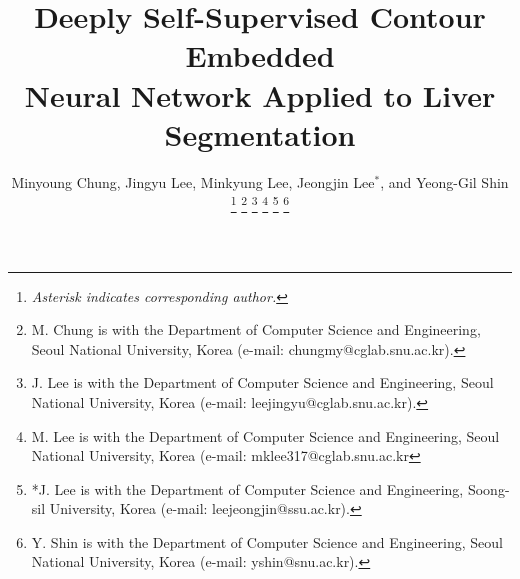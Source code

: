 \documentclass[journal]{IEEEtran}
\begin{document}
\title{Deeply Self-Supervised Contour Embedded\\ Neural Network Applied to Liver Segmentation}
\author{Minyoung Chung, Jingyu Lee, Minkyung Lee, Jeongjin Lee$^{\ast}$, and Yeong-Gil Shin%
\thanks{\textit{Asterisk indicates corresponding author.}}%
\thanks{M. Chung is with the Department of Computer Science and Engineering, Seoul National University, Korea (e-mail: chungmy@cglab.snu.ac.kr).}%
\thanks{J. Lee is with the Department of Computer Science and Engineering, Seoul National University, Korea (e-mail: leejingyu@cglab.snu.ac.kr).}%
\thanks{M. Lee is with the Department of Computer Science and Engineering, Seoul National University, Korea (e-mail: mklee317@cglab.snu.ac.kr}%
\thanks{*J. Lee is with the Department of Computer Science and Engineering, Soong-sil University, Korea (e-mail: leejeongjin@ssu.ac.kr).}%
\thanks{Y. Shin is with the Department of Computer Science and Engineering, Seoul National University, Korea (e-mail: yshin@snu.ac.kr).}}



\maketitle
\end{document}
